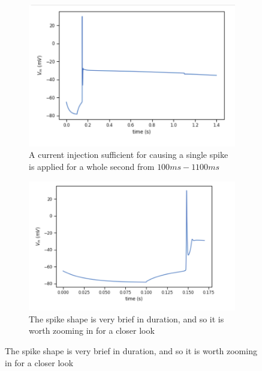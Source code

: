 \begin{figure}
\begin{center}


\centering
\begin{subfigure}{.2}
  \centering
    \includegraphics[scale=0.5]{figures/correct_active_l5pc.png}
    \caption{A current injection sufficient for causing a single spike is applied for a whole second from $100ms-1100ms$}
  \label{fig:sub1}
\end{subfigure}

\centering
\begin{subfigure}{.2}
  \centering
    \includegraphics[scale=0.5]{figures/spike_shape.png}
    \caption{The spike shape is very brief in duration, and so it is worth zooming in for a closer look}
  \label{fig:sub1}
\end{subfigure}



\end{center}
\end{figure}
